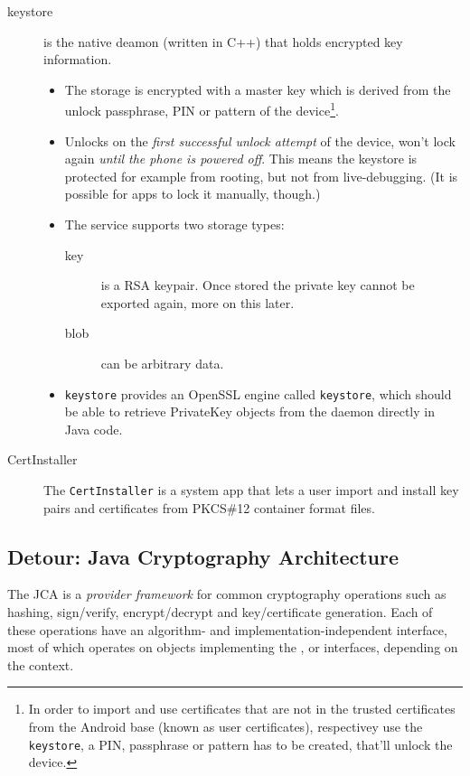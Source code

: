 \documentclass[a4paper,draft]{scrartcl}
\begin{document}
\begin{description}
			\item[keystore] is the native deamon (written in C++) that holds encrypted key information.
				\begin{itemize}
					\item The storage is encrypted with a master key which is derived from the unlock passphrase, PIN or pattern of the device\footnote{In order to import and use certificates that are not in the trusted certificates from the Android base (known as user certificates), respectivey use the \texttt{keystore}, a PIN, passphrase or pattern has to be created, that'll unlock the device.}.
					\item Unlocks on the \emph{first successful unlock attempt} of the device, won't lock again \emph{until the phone is powered off}. This means the keystore is protected for example from rooting, but not from live-debugging. (It is possible for apps to lock it manually, though.)
					\item The service supports two storage types:
					\begin{description}
						\item[key] is a RSA keypair. Once stored the private key cannot be exported again, more on this later.
						\item[blob] can be arbitrary data.
					\end{description}
					\item \texttt{keystore} provides an OpenSSL engine called \texttt{keystore}, which should be able to retrieve PrivateKey objects from the daemon directly in Java code.
				\end{itemize}
			\item [CertInstaller] The \texttt{CertInstaller} is a system app that lets a user import and install key pairs and certificates from PKCS\#12 container format files. %
		\end{description}

	\subsection*{Detour: Java Cryptography Architecture}
		The JCA is a {\em provider framework} for common cryptography operations such as hashing, sign/verify, encrypt/decrypt and key/certificate generation. Each of these operations have an algorithm- and	implementation-independent interface, most of which operates on objects implementing the ,  or  interfaces, depending on the context.
\end{document}

